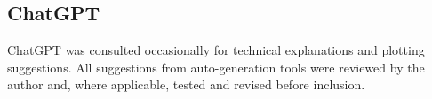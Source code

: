 \documentclass[11pt,a4paper]{article}
\theoremstyle{definition}
\begin{document}
\subsection{ChatGPT}
ChatGPT was consulted occasionally for technical explanations and
plotting suggestions. All suggestions from auto-generation tools were
reviewed by the author and, where applicable, tested and revised before
inclusion.
\clearpage


\end{document}
